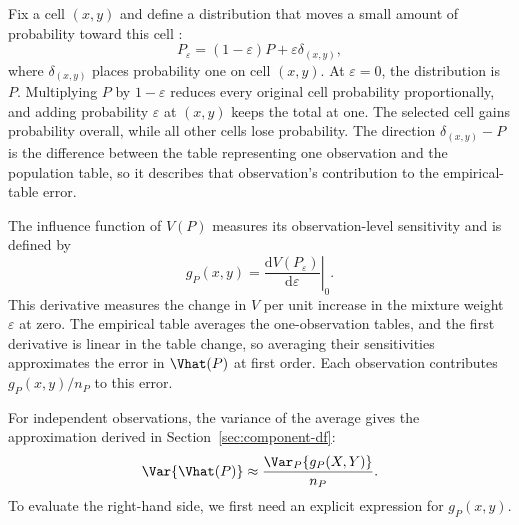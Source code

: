 \begin{samepage}
Fix a cell \((x,y)\) and define a distribution that moves a small amount
of probability toward this cell \citep{hampel1974,vanderVaart1998}:
\begin{equation}
  P_\varepsilon
  =(1-\varepsilon)P+\varepsilon\delta_{(x,y)},
  \label{eq:contamination-path}
\end{equation}
where \(\delta_{(x,y)}\) places probability one on cell \((x,y)\). At
\(\varepsilon=0\), the distribution is \(P\). Multiplying \(P\) by
\(1-\varepsilon\) reduces every original cell probability proportionally,
and adding probability \(\varepsilon\) at \((x,y)\) keeps the total at
one. The selected cell gains probability overall, while all other cells
lose probability. The direction \(\delta_{(x,y)}-P\) is the
difference between the table representing one observation and the
population table, so it describes that observation's contribution to
the empirical-table error.
\par
\end{samepage}

The influence function of \(V(P)\) measures its observation-level
sensitivity and is defined by
\begin{equation}
  g_P(x,y)
  =
  \left.
  \frac{\mathrm d V(P_\varepsilon)}{\mathrm d\varepsilon}
  \right|_{0}.
  \label{eq:g-definition}
\end{equation}
This derivative measures the change in \(V\) per unit increase in the
mixture weight \(\varepsilon\) at zero. The empirical table averages the
one-observation tables, and the first derivative is linear in the table
change, so averaging their sensitivities approximates the error in
\(\Vhat(P)\) at first order. Each observation contributes
\(g_P(x,y)/n_P\) to this error.

\begin{samepage}
For independent observations, the variance of the average gives the approximation derived in
Section~\ref{sec:component-df}:
\begin{equation*}
  \Var\{\Vhat(P)\}
  \approx\frac{\Var_P\{g_P(X,Y)\}}{n_P}.
\end{equation*}
To evaluate the right-hand side, we first need an explicit expression
for \(g_P(x,y)\).
\par
\end{samepage}

